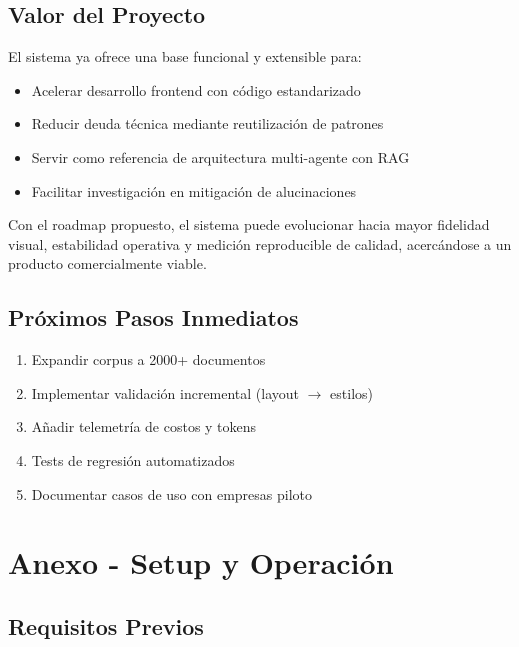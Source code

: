 \documentclass[12pt,a4paper]{article}
\begin{document}
\subsection{Valor del Proyecto}

El sistema ya ofrece una base funcional y extensible para:

\begin{itemize}
    \item Acelerar desarrollo frontend con código estandarizado
    \item Reducir deuda técnica mediante reutilización de patrones
    \item Servir como referencia de arquitectura multi-agente con RAG
    \item Facilitar investigación en mitigación de alucinaciones
\end{itemize}

Con el roadmap propuesto, el sistema puede evolucionar hacia mayor fidelidad visual, estabilidad operativa y medición reproducible de calidad, acercándose a un producto comercialmente viable.

\subsection{Próximos Pasos Inmediatos}

\begin{enumerate}
    \item Expandir corpus a 2000+ documentos
    \item Implementar validación incremental (layout $\rightarrow$ estilos)
    \item Añadir telemetría de costos y tokens
    \item Tests de regresión automatizados
    \item Documentar casos de uso con empresas piloto
\end{enumerate}

\section{Anexo - Setup y Operación}

\subsection{Requisitos Previos}
\end{document}
